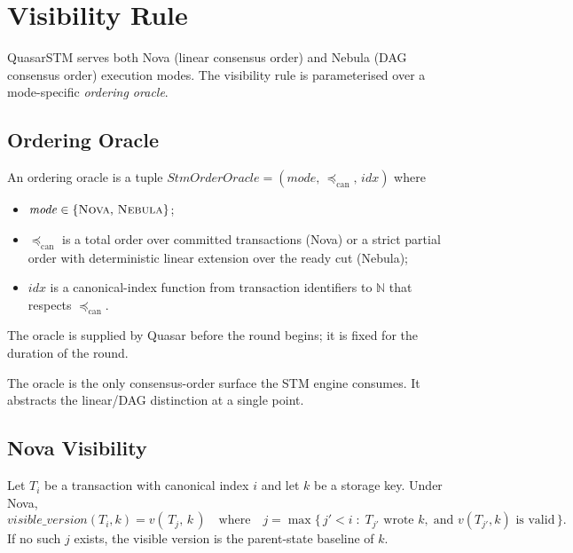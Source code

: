 \section{Visibility Rule}

\label{sec:visibility}

QuasarSTM serves both Nova (linear consensus order) and Nebula (DAG
consensus order) execution modes. The visibility rule is parameterised
over a mode-specific \emph{ordering oracle}.

\subsection{Ordering Oracle}

\begin{definition}
\label{def:order-oracle}
An ordering oracle is a tuple
$\mathit{StmOrderOracle} = (\mathit{mode},\, {\preceq_{\mathrm{can}}},\,
\mathit{idx})$ where
\begin{itemize}[leftmargin=2em,nosep]
\item $\mathit{mode} \in \{\textsc{Nova},\, \textsc{Nebula}\}$;
\item $\preceq_{\mathrm{can}}$ is a total order over committed
      transactions (Nova) or a strict partial order with deterministic
      linear extension over the ready cut (Nebula);
\item $\mathit{idx}$ is a canonical-index function from transaction
      identifiers to $\mathbb{N}$ that respects
      $\preceq_{\mathrm{can}}$.
\end{itemize}
The oracle is supplied by Quasar before the round begins; it is
fixed for the duration of the round.
\end{definition}

The oracle is the only consensus-order surface the STM engine
consumes. It abstracts the linear/DAG distinction at a single point.

\subsection{Nova Visibility}

\begin{definition}
\label{def:visible-nova}
Let $T_i$ be a transaction with canonical index $i$ and let $k$ be a
storage key. Under Nova,
\[
\mathit{visible\_version}(T_i, k) =
v(\,T_j,\, k\,) \quad \text{where} \quad
j = \max \bigl\{\, j' < i \;:\; T_{j'} \text{ wrote } k,\;
\text{and } v(T_{j'},k) \text{ is valid} \,\bigr\}.
\]
If no such $j$ exists, the visible version is the parent-state
baseline of $k$.
\end{definition}

